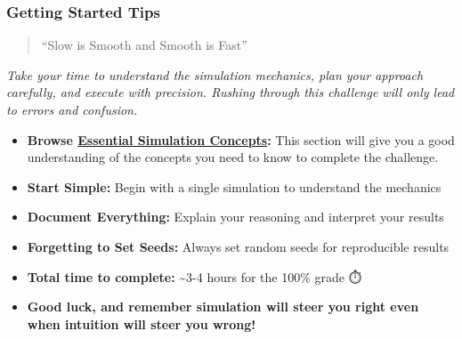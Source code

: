 \documentclass[
  letterpaper,
  DIV=11,
  numbers=noendperiod]{scrartcl}
\providecommand{\tightlist}{%
  \setlength{\itemsep}{0pt}\setlength{\parskip}{0pt}}
\theoremstyle{definition}
\theoremstyle{remark}
\begin{document}
\subsubsection{Getting Started Tips}\label{getting-started-tips}

\begin{tcolorbox}[enhanced jigsaw, rightrule=.15mm, leftrule=.75mm, toptitle=1mm, bottomtitle=1mm, title=\textcolor{quarto-callout-note-color}{\faInfo}\hspace{0.5em}{🎯 Navy SEALs Motto}, opacityback=0, colbacktitle=quarto-callout-note-color!10!white, arc=.35mm, coltitle=black, colback=white, breakable, titlerule=0mm, colframe=quarto-callout-note-color-frame, toprule=.15mm, bottomrule=.15mm, left=2mm, opacitybacktitle=0.6]

\begin{quote}
``Slow is Smooth and Smooth is Fast''
\end{quote}

\emph{Take your time to understand the simulation mechanics, plan your
approach carefully, and execute with precision. Rushing through this
challenge will only lead to errors and confusion.}

\end{tcolorbox}

\begin{itemize}
\tightlist
\item
  \textbf{Browse \href{@sec-simulation-concepts}{Essential Simulation
  Concepts}:} This section will give you a good understanding of the
  concepts you need to know to complete the challenge.
\item
  \textbf{Start Simple:} Begin with a single simulation to understand
  the mechanics
\item
  \textbf{Document Everything:} Explain your reasoning and interpret
  your results
\item
  \textbf{Forgetting to Set Seeds:} Always set random seeds for
  reproducible results
\item
  \textbf{Total time to complete:} \textasciitilde3-4 hours for the
  100\% grade ⏱️
\item
  \textbf{Good luck, and remember simulation will steer you right even
  when intuition will steer you wrong!} 🎲
\end{itemize}
\end{document}
